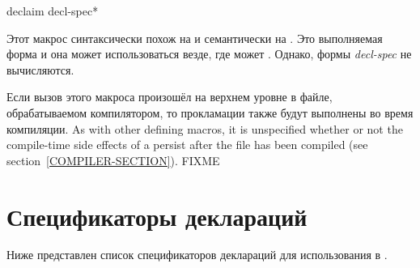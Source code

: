 \begin{defmac}
declaim {decl-spec}*

Этот макрос синтаксически похож на  и семантически на
. Это выполняемая форма и она может использоваться везде, где
может . Однако, формы \emph{decl-spec} не вычисляются.

Если вызов этого макроса произошёл на верхнем уровне в файле, обрабатываемом
компилятором, то прокламации также будут выполнены во время компиляции. 
As with other defining macros, it is 
unspecified whether or not the compile-time side effects of a 
 persist after the file has been compiled
(see section~\ref{COMPILER-SECTION}). FIXME
\end{defmac}

\section{Спецификаторы деклараций}
\label{DECLARATION-SPECIFIERS-SECTION}

Ниже представлен список спецификаторов деклараций для использования в
.

